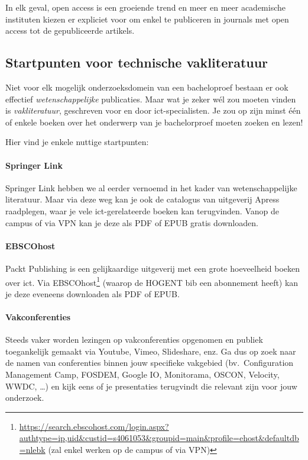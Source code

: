 In elk geval, open access is een groeiende trend en meer en meer academische instituten kiezen er expliciet voor om enkel te publiceren in journals met open access tot de gepubliceerde artikels.

\subsection{Startpunten voor technische vakliteratuur}%
\label{ssec:technische-vakliteratuur}

Niet voor elk mogelijk onderzoeksdomein van een bacheloproef bestaan er ook effectief \textit{wetenschappelijke} publicaties. Maar wat je zeker wél zou moeten vinden is \textit{vakliteratuur}, geschreven voor en door ict-specialisten. Je zou op zijn minst één of enkele boeken over het onderwerp van je bachelorproef moeten zoeken en lezen!

Hier vind je enkele nuttige startpunten:

\paragraph{Springer Link}

Springer Link hebben we al eerder vernoemd in het kader van wetenschappelijke literatuur. Maar via deze weg kan je ook de catalogus van uitgeverij Apress raadplegen, waar je vele ict-gerelateerde boeken kan terugvinden. Vanop de campus of via VPN kan je deze als PDF of EPUB gratis downloaden.

\paragraph{EBSCOhost}

Packt Publishing is een gelijkaardige uitgeverij met een grote hoeveelheid boeken over ict. Via EBSCOhost\footnote{\url{https://search.ebscohost.com/login.aspx?authtype=ip,uid&custid=s4061053&groupid=main&profile=ehost&defaultdb=nlebk} (zal enkel werken op de campus of via VPN)} (waarop de HOGENT bib een abonnement heeft) kan je deze eveneens downloaden als PDF of EPUB.

\paragraph{Vakconferenties}

Steeds vaker worden lezingen op vakconferenties opgenomen en publiek toegankelijk gemaakt via Youtube, Vimeo, Slideshare, enz. Ga dus op zoek naar de namen van conferenties binnen jouw specifieke vakgebied (bv.\ Configuration Management Camp, FOSDEM, Google IO, Monitorama, OSCON, Velocity, WWDC, \ldots) en kijk eens of je presentaties terugvindt die relevant zijn voor jouw onderzoek.

